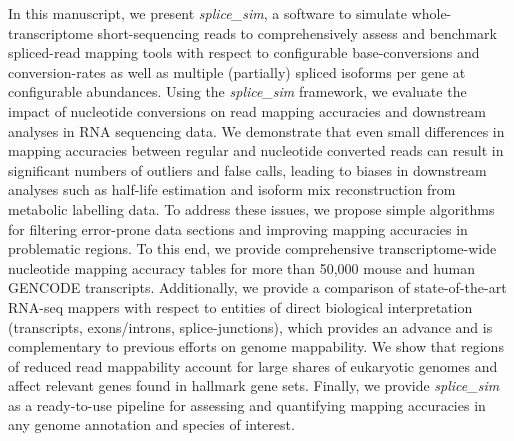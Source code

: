 In this manuscript, we present \textit{splice\_sim}, a software to simulate whole-transcriptome short-sequencing reads to comprehensively assess and benchmark spliced-read mapping tools with respect to configurable base-conversions and conversion-rates as well as multiple (partially) spliced isoforms per gene at configurable abundances. Using the \textit{splice\_sim} framework, we evaluate the impact of nucleotide conversions on read mapping accuracies and downstream analyses in RNA sequencing data. We demonstrate that even small differences in mapping accuracies between regular and nucleotide converted reads can result in significant numbers of outliers and false calls, leading to biases in downstream analyses such as half-life estimation and isoform mix reconstruction from metabolic labelling data. To address these issues, we propose simple algorithms for filtering error-prone data sections and improving mapping accuracies in problematic regions. To this end, we provide comprehensive transcriptome-wide nucleotide mapping accuracy tables for more than 50,000 mouse and human GENCODE transcripts. Additionally, we provide a comparison of state-of-the-art RNA-seq mappers with respect to entities of direct biological interpretation (transcripts, exons/introns, splice-junctions), which provides an advance and is complementary to previous efforts on genome mappability. We show that regions of reduced read mappability account for large shares of eukaryotic genomes and affect relevant genes found in hallmark gene sets. Finally, we provide \textit{splice\_sim} as a ready-to-use pipeline for assessing and quantifying mapping accuracies in any genome annotation and species of interest.


